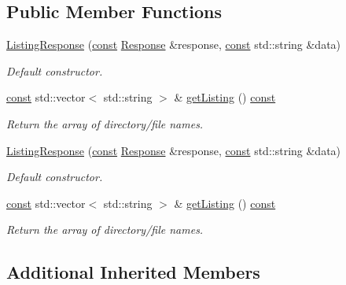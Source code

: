 \subsection*{Public Member Functions}
\begin{DoxyCompactItemize}
\item 
\hyperlink{classsf_1_1_ftp_1_1_listing_response_a7e98d0aed70105c71adb52e5b6ce0bb8}{Listing\-Response} (\hyperlink{term__entry_8h_a57bd63ce7f9a353488880e3de6692d5a}{const} \hyperlink{classsf_1_1_ftp_1_1_response}{Response} \&response, \hyperlink{term__entry_8h_a57bd63ce7f9a353488880e3de6692d5a}{const} std\-::string \&data)
\begin{DoxyCompactList}\small\item\em Default constructor. \end{DoxyCompactList}\item 
\hyperlink{term__entry_8h_a57bd63ce7f9a353488880e3de6692d5a}{const} std\-::vector$<$ std\-::string $>$ \& \hyperlink{classsf_1_1_ftp_1_1_listing_response_a5f0771b52a966bf25b33a70602b6f97f}{get\-Listing} () \hyperlink{term__entry_8h_a57bd63ce7f9a353488880e3de6692d5a}{const} 
\begin{DoxyCompactList}\small\item\em Return the array of directory/file names. \end{DoxyCompactList}\item 
\hyperlink{classsf_1_1_ftp_1_1_listing_response_a7e98d0aed70105c71adb52e5b6ce0bb8}{Listing\-Response} (\hyperlink{term__entry_8h_a57bd63ce7f9a353488880e3de6692d5a}{const} \hyperlink{classsf_1_1_ftp_1_1_response}{Response} \&response, \hyperlink{term__entry_8h_a57bd63ce7f9a353488880e3de6692d5a}{const} std\-::string \&data)
\begin{DoxyCompactList}\small\item\em Default constructor. \end{DoxyCompactList}\item 
\hyperlink{term__entry_8h_a57bd63ce7f9a353488880e3de6692d5a}{const} std\-::vector$<$ std\-::string $>$ \& \hyperlink{classsf_1_1_ftp_1_1_listing_response_a5f0771b52a966bf25b33a70602b6f97f}{get\-Listing} () \hyperlink{term__entry_8h_a57bd63ce7f9a353488880e3de6692d5a}{const} 
\begin{DoxyCompactList}\small\item\em Return the array of directory/file names. \end{DoxyCompactList}\end{DoxyCompactItemize}
\subsection*{Additional Inherited Members}


